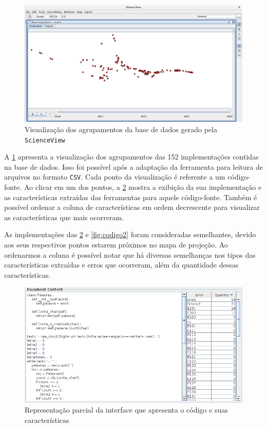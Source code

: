 		\begin{figure}[h]
			\centering
			\includegraphics[width=1\linewidth]{imagem/projecaoFinal}
			\caption[Visualização dos agrupamentos da base de dados gerado pela \texttt{ScienceView}]
			{Visualização dos agrupamentos da base de dados gerado pela \texttt{ScienceView} \cite{Alencar-etal:2012}}
			\label{fig:projecaoFinal}
		\end{figure}
		
		A \cref{fig:projecaoFinal} apresenta a visualização dos agrupamentos das 152
		implementações contidas na base de dados. Isso foi possível após a adaptação da
		ferramenta para leitura de arquivos no formato \texttt{CSV}. Cada ponto da
		visualização é referente a um código-fonte. Ao clicar em um dos pontos, a
		\cref{fig:codigo1} mostra a exibição da sua implementação e
		as características extraídas das ferramentas para aquele código-fonte. Também
		é possível ordenar a coluna de características  em ordem
		decrescente para visualizar as características que mais ocorreram.
		
		As implementações das \cref{fig:codigo1} e \cref{fig:codigo2} foram consideradas
		semelhantes, devido aos seus respectivos pontos estarem próximos no mapa de
		projeção. Ao ordenarmos a coluna  é possível notar que há
		diversas semelhanças nos tipos das características extraídas e erros que
		ocorreram, além da quantidade dessas características.
		
		\begin{figure}[h]
			\centering
			\includegraphics[width=0.8\linewidth]{imagem/codigo1}
			\caption[Representação parcial da interface que apresenta o código e suas características]
			{Representação parcial da interface que apresenta o código e suas características \cite{Alencar-etal:2012}}
			\label{fig:codigo1}
		\end{figure}
		
